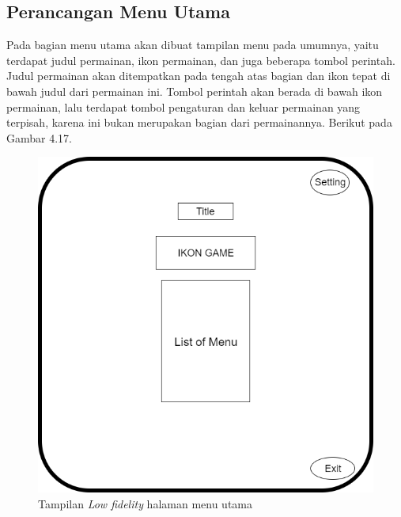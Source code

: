 	\subsection{Perancangan Menu Utama}
	Pada bagian menu utama akan dibuat tampilan menu pada umumnya, yaitu terdapat judul permainan, ikon permainan, dan juga beberapa tombol perintah. Judul permainan akan ditempatkan pada tengah atas bagian dan ikon tepat di bawah judul dari permainan ini. Tombol perintah akan berada di bawah ikon permainan, lalu terdapat tombol pengaturan dan keluar permainan yang terpisah, karena ini bukan merupakan bagian dari permainannya. Berikut pada Gambar 4.17.
	\begin{figure}
		\centering
		\includegraphics[width=\linewidth-80pt]{pics/low/low1}
		\caption{Tampilan \textit{Low fidelity} halaman menu utama}
	\end{figure}
	

